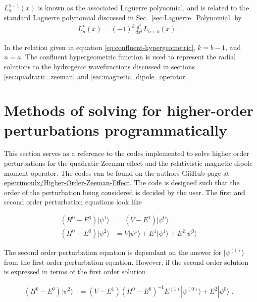         \noindent $L_a^{b-1}(x)$ is known as the associated Laguerre polynomial, and is related to the standard Laguerre polynomial discussed in Sec.~\ref{sec:Laguerre_Polynomial} by 
        \begin{align}
            L_n^k(x) = (-1)^k \frac{d^k}{dx^k} L_{n+k}(x)\;.
        \end{align}

        \noindent In the relation given in equation \eqref{eq:confluent-hypergeometric}, $k = {b-1}$, and $n = a$. The confluent hypergeometric function is used to represent the radial solutions to the hydrogenic wavefunctions discussed in sections \ref{sec:quadratic_zeeman} and \ref{sec:magnetic_dipole_operator}.


\chapter{Methods of solving for higher-order perturbations programmatically} \label{sec:Program_perturbation}
    This section serves as a reference to the codes implemented to solve higher order perturbations for the quadratic Zeeman effect and the relativistic magnetic dipole moment operator. The codes can be found on the authors GitHub page at \href{https://github.com/epetrimoulx/Quadratic-Zeeman-Effect}{epetrimoulx/Higher-Order-Zeeman-Effect}. The code is designed such that the order of the perturbation being considered is decided by the user. The first and second order perturbation equations look like 

    \begin{align}
        \left( H^0 - E^0 \right) \vert \psi^{1}\rangle &= \left( V - E^{1}\right) \vert \psi^{0} \rangle \\
        \left( H^0 - E^0 \right) \vert \psi^{2}\rangle &= V \vert \psi^{1}\rangle + E^{1} \vert \psi^{1} \rangle + E^{2} \vert \psi^{0} \rangle
    \end{align}

    \noindent The second order perturbation equation is dependant on the answer for $\vert \psi^{(1)} \rangle$ from the first order perturbation equation. However, if the second order solution is expressed in terms of the first order solution

    \begin{align}
        \left( H^0 - E^0 \right) \vert \psi^{2}\rangle &= \left(V - E^{1}\right) (H^0 - E^0)^{-1} E^{(1)} |\psi^{(0)}\rangle + E^{2} |\psi^{0}\rangle\;.
    \end{align}

